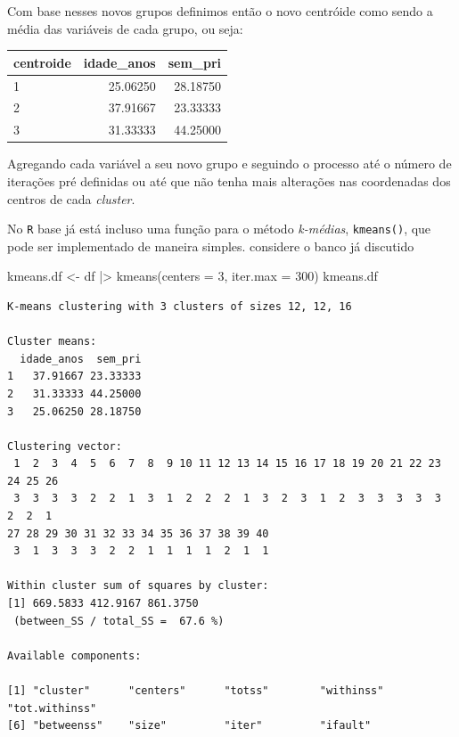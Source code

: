 \documentclass[
  letterpaper,
  DIV=11,
  numbers=noendperiod]{scrreprt}
\newenvironment{Shaded}{\begin{snugshade}}{\end{snugshade}}
\newcommand{\AttributeTok}[1]{\textcolor[rgb]{0.40,0.45,0.13}{#1}}
\newcommand{\DecValTok}[1]{\textcolor[rgb]{0.68,0.00,0.00}{#1}}
\newcommand{\FunctionTok}[1]{\textcolor[rgb]{0.28,0.35,0.67}{#1}}
\newcommand{\NormalTok}[1]{\textcolor[rgb]{0.00,0.23,0.31}{#1}}
\newcommand{\OtherTok}[1]{\textcolor[rgb]{0.00,0.23,0.31}{#1}}
\newcommand{\SpecialCharTok}[1]{\textcolor[rgb]{0.37,0.37,0.37}{#1}}
\begin{document}
Com base nesses novos grupos definimos então o novo centróide como sendo
a média das variáveis de cada grupo, ou seja:

\begin{longtable}[]{@{}lrr@{}}
\toprule()
centroide & idade\_anos & sem\_pri \\
\midrule()
\endhead
1 & 25.06250 & 28.18750 \\
2 & 37.91667 & 23.33333 \\
3 & 31.33333 & 44.25000 \\
\bottomrule()
\end{longtable}

Agregando cada variável a seu novo grupo e seguindo o processo até o
número de iterações pré definidas ou até que não tenha mais alterações
nas coordenadas dos centros de cada \emph{cluster}.

No \texttt{R} base já está incluso uma função para o método
\emph{k-médias}, \texttt{kmeans()}, que pode ser implementado de maneira
simples. considere o banco já discutido

\begin{Shaded}
\begin{Highlighting}[]
\NormalTok{kmeans.df }\OtherTok{\textless{}{-}}\NormalTok{ df }\SpecialCharTok{|\textgreater{}}
  \FunctionTok{kmeans}\NormalTok{(}\AttributeTok{centers =} \DecValTok{3}\NormalTok{, }\AttributeTok{iter.max =} \DecValTok{300}\NormalTok{)}
\NormalTok{kmeans.df}
\end{Highlighting}
\end{Shaded}

\begin{verbatim}
K-means clustering with 3 clusters of sizes 12, 12, 16

Cluster means:
  idade_anos  sem_pri
1   37.91667 23.33333
2   31.33333 44.25000
3   25.06250 28.18750

Clustering vector:
 1  2  3  4  5  6  7  8  9 10 11 12 13 14 15 16 17 18 19 20 21 22 23 24 25 26 
 3  3  3  3  2  2  1  3  1  2  2  2  1  3  2  3  1  2  3  3  3  3  3  2  2  1 
27 28 29 30 31 32 33 34 35 36 37 38 39 40 
 3  1  3  3  3  2  2  1  1  1  1  2  1  1 

Within cluster sum of squares by cluster:
[1] 669.5833 412.9167 861.3750
 (between_SS / total_SS =  67.6 %)

Available components:

[1] "cluster"      "centers"      "totss"        "withinss"     "tot.withinss"
[6] "betweenss"    "size"         "iter"         "ifault"      
\end{verbatim}
\end{document}
